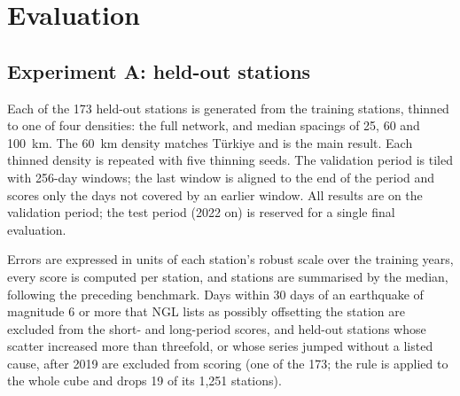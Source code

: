 \documentclass[preprint,12pt,authoryear]{elsarticle}
\begin{document}
\section{Evaluation}
\label{sec:eval}

\subsection{Experiment A: held-out stations}

Each of the 173 held-out stations is generated from the training stations, thinned to one
of four densities: the full network, and median spacings of 25, 60 and 100~km. The 60~km
density matches T\"urkiye and is the main result. Each thinned density is repeated with
five thinning seeds. The validation period is tiled with 256-day windows; the last window
is aligned to the end of the period and scores only the days not covered by an earlier
window. All results are on the validation period; the test period (2022 on) is reserved
for a single final evaluation.

Errors are expressed in units of each station's robust scale over the training years,
every score is computed per station, and stations are summarised by the median, following
the preceding benchmark. Days within 30 days of an earthquake of magnitude 6 or more that
NGL lists as possibly offsetting the station are excluded from the short- and long-period
scores, and held-out stations whose scatter increased more than threefold, or whose
series jumped without a listed cause, after 2019 are excluded from scoring (one of the
173; the rule is applied to the whole cube and drops 19 of its 1,251 stations).
\end{document}
